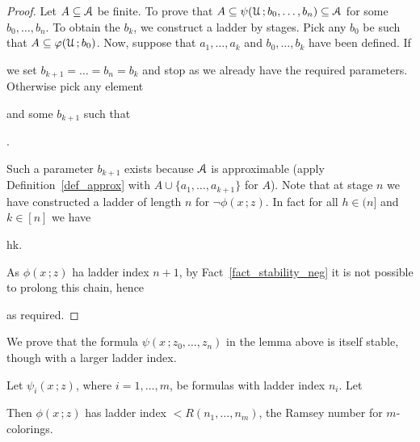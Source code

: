 \documentclass[scombinatorics.tex]{subfiles}
\begin{document}
\begin{proof}
  Let $A\subseteq\EuScript A$ be finite.
  To prove that $A\subseteq\psi(\EuScript U\,;b_0,\dots,b_n)\subseteq\EuScript A$ for some $b_0,\dots,b_n$.
  To obtain the $b_k$, we construct a ladder by stages.
  Pick any $b_0$ be such that $A\subseteq\varphi(\EuScript U\,;b_0)$.
  Now, suppose that $a_1,\dots,a_k$ and $b_0,\dots,b_k$ have been defined.
  If 


  we set $b_{k+1}=\dots=b_n=b_k$ and stop as we already have the required parameters.
  Otherwise pick any element


  and some $b_{k+1}$ such that

  .

  Such a parameter $b_{k+1}$ exists because $\EuScript A$ is approximable (apply Definition~\ref{def_approx} with $A\cup\{a_1,\dots,a_{k+1}\}$ for $A$).
  Note that at stage $n$ we have constructed a ladder of length $n$ for $\neg\phi(x\,;z)$.
  In fact for all $h\in(n]$ and $k\in[n]$ we have
  
  {\IFF}
  {h\le k.}
  
  As $\phi(x\,;z)$ ha ladder index $n+1$, by Fact~\ref{fact_stability_neg} it is not possible to prolong this chain, hence


  as required.
\end{proof}

We prove that the formula $\psi(x\,;z_0,\dots,z_n)$ in the lemma above is itself stable, though with a larger ladder index.
  
\begin{lemma}
  Let $\psi_i(x\,;z)$, where $i=1,\dots,m$, be formulas with ladder index $n_i$. Let
  
  
  Then $\phi(x\,;z)$ has ladder index $<R(n_1,\dots, n_m)$, the Ramsey number for $m$-colorings.
\end{lemma}
  
\end{document}
